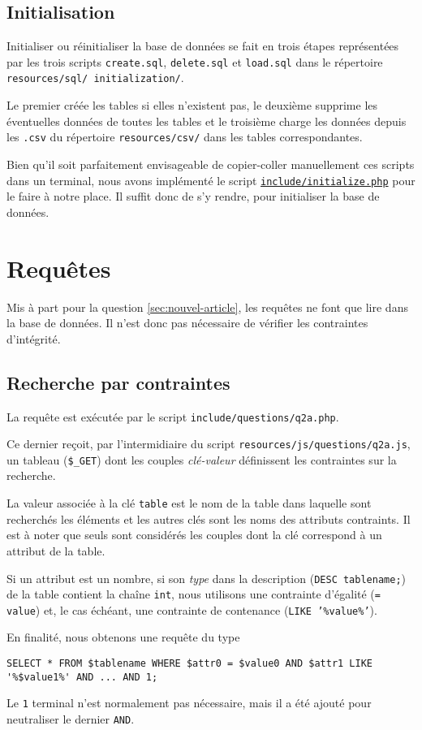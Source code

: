 \documentclass[a4paper, 12pt]{article}
\begin{document}
	\subsection{Initialisation}
    Initialiser ou réinitialiser la base de données se fait en trois étapes représentées par les trois scripts \texttt{create.sql}, \texttt{delete.sql} et \texttt{load.sql} dans le répertoire \texttt{resources/sql/ initialization/}. \par
    Le premier créée les tables si elles n'existent pas, le deuxième supprime les éventuelles données de toutes les tables et le troisième charge les données depuis les \texttt{.csv} du répertoire \texttt{resources/csv/} dans les tables correspondantes. \par
    Bien qu'il soit parfaitement envisageable de copier-coller manuellement ces scripts dans un terminal, nous avons implémenté le script \href{http://www.student.montefiore.ulg.ac.be/~s161024/include/initialize.php}{\texttt{include/initialize.php}} pour le faire à notre place. Il suffit donc de s'y rendre, pour initialiser la base de données.
    \section{Requêtes}
    Mis à part pour la question \ref{sec:nouvel-article}, les requêtes ne font que lire dans la base de données. Il n'est donc pas nécessaire de vérifier les contraintes d'intégrité.
    \renewcommand\thesubsection{\thesection.\alph{subsection}}
    \subsection{Recherche par contraintes}
    La requête est exécutée par le script \texttt{include/questions/q2a.php}.
    
    Ce dernier reçoit, par l'intermidiaire du script \texttt{resources/js/questions/q2a.js}, un tableau (\texttt{\$\_GET}) dont les couples \emph{clé-valeur} définissent les contraintes sur la recherche. \par
    La valeur associée à la clé \texttt{table} est le nom de la table dans laquelle sont recherchés les éléments et les autres clés sont les noms des attributs contraints. Il est à noter que seuls sont considérés les couples dont la clé correspond à un attribut de la table. \par
    Si un attribut est un nombre, \cad{} si son \emph{type} dans la description (\texttt{DESC tablename;}) de la table contient la chaîne \texttt{int}, nous utilisons une contrainte d'égalité (\texttt{= value}) et, le cas échéant, une contrainte de contenance (\texttt{LIKE '\%value\%'}). \par
    En finalité, nous obtenons une requête du type 
    \begin{lstlisting}[style=sql, gobble=8]
        SELECT * FROM $tablename WHERE $attr0 = $value0 AND $attr1 LIKE '%$value1%' AND ... AND 1;
    \end{lstlisting}
    Le \texttt{1} terminal n'est normalement pas nécessaire, mais il a été ajouté pour neutraliser le dernier \texttt{AND}.
\end{document}
